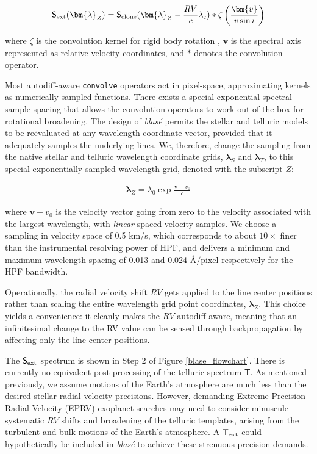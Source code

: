 \documentclass[trackchanges]{aastex631}
\begin{document}
\begin{eqnarray}
    \mathsf{S}_{\rm ext}(\bm{\lambda}_Z) = \mathsf{S}_{\rm clone}(\bm{\lambda}_Z - \frac{RV}{c}\lambda_\mathrm{c}) * \zeta \left(\frac{\bm{v}}{v\sin{i}}\right) \label{eqn_convolution}
\end{eqnarray}

\noindent where $\zeta$ is the convolution kernel for rigid body rotation \citep[\emph{e.g.}][]{2022ApJS..258...31K}, $\bm{v}$ is the spectral axis represented as relative velocity coordinates, and $*$ denotes the convolution operator.

Most autodiff-aware \texttt{convolve} operators act in pixel-space, approximating kernels as numerically sampled functions.  There exists a special exponential spectral sample spacing that allows the convolution operators to work out of the box for rotational broadening.  The design of \emph{blas\'e} permits the stellar and telluric models to be re\"evaluated at any wavelength coordinate vector, provided that it adequately samples the underlying lines.  We, therefore, change the sampling from the native stellar and telluric wavelength coordinate grids, $\bm{\lambda}_S$ and $\bm{\lambda}_T$, to this special exponentially sampled wavelength grid, denoted with the subscript $Z$:

\begin{eqnarray}
    \bm{\lambda}_Z = \lambda_0  \exp{\frac{\bm{v}-v_0}{c}}
\end{eqnarray}

\noindent where $\bm{v}-v_0$ is the velocity vector going from zero to the velocity associated with the largest wavelength, with \emph{linear} spaced velocity samples.  We choose a sampling in velocity space of 0.5 km/s, which corresponds to about $10\times$ finer than the instrumental resolving power of HPF, and delivers a minimum and maximum wavelength spacing of 0.013 and 0.024 \AA$/\text{pixel}$ respectively for the HPF bandwidth.

Operationally, the radial velocity shift $RV$ gets applied to the line center positions rather than scaling the entire wavelength grid point coordinates, $\bm{\lambda}_Z$. This choice yields a convenience: it cleanly makes the $RV$ autodiff-aware, meaning that an infinitesimal change to the RV value can be sensed through backpropagation by affecting only the line center positions.

The $\mathsf{S}_{\rm ext}$ spectrum is shown in Step 2 of Figure \ref{blase_flowchart}.  There is currently no equivalent post-processing of the telluric spectrum $\mathsf{T}$.  As mentioned previously, we assume motions of the Earth's atmosphere are much less than the desired stellar radial velocity precisions.  However, demanding Extreme Precision Radial Velocity (EPRV) exoplanet searches may need to consider minuscule systematic $RV$ shifts and broadening of the telluric templates, arising from the turbulent and bulk motions of the Earth's atmosphere.  A $\mathsf{T}_{\rm ext}$ could hypothetically be included in  \emph{blas\'e} to achieve these strenuous precision demands.
\end{document}
